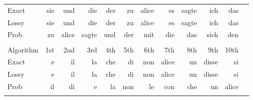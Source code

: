 \documentclass{article}
\begin{document}
\begin{longtable}{lrrrrrrrrrrr}
Exact & sie & und & die & der & zu & alice & es & sagte & ich & das \\
Lossy & sie & und & die & der & zu & alice & es & sagte & ich & das \\
Prob & zu & alice & sagte & und & der & mit & die & das & sich & den \\
\bottomrule
\addlinespace[1em]
\multicolumn{12}{l}{\textbf{Italian}} \\
\toprule
Algorithm & 1st & 2nd & 3rd & 4th & 5th & 6th & 7th & 8th & 9th & 10th \\\midrule
Exact & e & il & la & che & di & non & alice & un & disse & si \\
Lossy & e & il & la & che & di & non & alice & un & disse & si \\
Prob & il & di & e & la & non & le & con & che & un & alice \\
\bottomrule
\addlinespace[1em]
\end{longtable}
\end{document}
